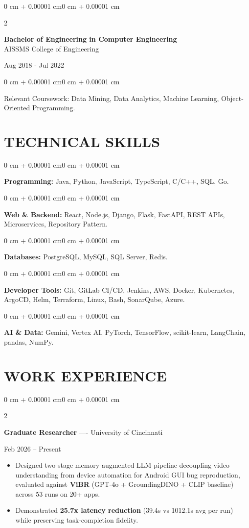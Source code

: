 \documentclass[10pt, letterpaper]{article}
\newenvironment{highlights}{
    \begin{itemize}[
        topsep=0.10 cm,
        parsep=0.06 cm,
        partopsep=0pt,
        itemsep=0.06 cm,
        leftmargin=12pt
    ]
}{
    \end{itemize}
}
\newenvironment{onecolentry}{
    \begin{adjustwidth}{0 cm + 0.00001 cm}{0 cm + 0.00001 cm}
}{
    \end{adjustwidth}
}
\newenvironment{twocolentry}[2][]{
    \onecolentry
    \def\secondColumn{#2}
    \setcolumnwidth{\fill, 4.5 cm}
    \begin{paracol}{2}
}{
    \switchcolumn \raggedleft \secondColumn
    \end{paracol}
    \endonecolentry
}
\begin{document}
\begin{twocolentry}{
    Aug 2018 - Jul 2022
}
    \textbf{Bachelor of Engineering in Computer Engineering} \\
    AISSMS College of Engineering
\end{twocolentry}
\begin{onecolentry}
Relevant Coursework: Data Mining, Data Analytics, Machine Learning, Object-Oriented Programming.
\end{onecolentry}
\section{TECHNICAL SKILLS}
\begin{onecolentry}
\textbf{Programming:} Java, Python, JavaScript, TypeScript, C/C++, SQL, Go.
\end{onecolentry}
\vspace{0.06 cm}
\begin{onecolentry}
\textbf{Web \& Backend:} React, Node.js, Django, Flask, FastAPI, REST APIs, Microservices, Repository Pattern.
\end{onecolentry}
\vspace{0.06 cm}
\begin{onecolentry}
\textbf{Databases:} PostgreSQL, MySQL, SQL Server, Redis.
\end{onecolentry}
\vspace{0.06 cm}
\begin{onecolentry}
\textbf{Developer Tools:} Git, GitLab CI/CD, Jenkins, AWS, Docker, Kubernetes, ArgoCD, Helm, Terraform, Linux, Bash, SonarQube, Azure.
\end{onecolentry}
\vspace{0.06 cm}
\begin{onecolentry}
\textbf{AI \& Data:} Gemini, Vertex AI, PyTorch, TensorFlow, scikit-learn, LangChain, pandas, NumPy.
\end{onecolentry}

\section{WORK EXPERIENCE}
\begin{twocolentry}{Feb 2026 -- Present}
\textbf{Graduate Researcher} ---- University of Cincinnati
\end{twocolentry}
\begin{highlights}
  \item Designed two-stage memory-augmented LLM pipeline decoupling video understanding from device automation for Android GUI bug reproduction, evaluated against \textbf{ViBR} (GPT-4o + GroundingDINO + CLIP baseline) across 53 runs on 20+ apps.
  \item Demonstrated \textbf{25.7x latency reduction} (39.4s vs 1012.1s avg per run) while preserving task-completion fidelity.
\end{highlights}
\end{document}
